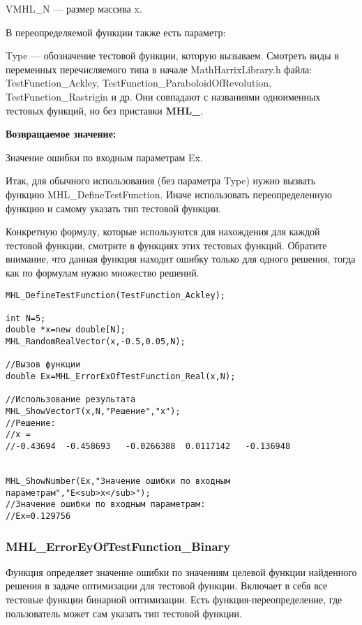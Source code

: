 \documentclass[a4paper,12pt]{article}
\begin{document}
VMHL\_N --- размер массива x.

В переопределяемой функции также есть параметр:
  
Type --- обозначение тестовой функции, которую вызываем.
Смотреть виды в переменных перечисляемого типа в начале MathHarrixLibrary.h файла: TestFunction\_Ackley, TestFunction\_ParaboloidOfRevolution, TestFunction\_Rastrigin и др. Они совпадают с названиями одноименных тестовых функций, но без приставки \textbf{MHL\_}.

\textbf{Возвращаемое значение:}
 
Значение ошибки по входным параметрам Ex.

Итак, для обычного использования (без параметра Type) нужно вызвать функцию MHL\_DefineTestFunction. Иначе использовать переопределенную функцию и самому указать тип тестовой функции.

Конкретную формулу, которые используются для нахождения для каждой тестовой функции, смотрите в функциях этих тестовых функций. Обратите внимание, что данная функция находит ошибку только для одного решения, тогда как по формулам нужно множество решений.


\begin{lstlisting}[label=code_use_MHL_ErrorExOfTestFunction_Real,caption=Пример использования]
MHL_DefineTestFunction(TestFunction_Ackley);

int N=5;
double *x=new double[N];
MHL_RandomRealVector(x,-0.5,0.05,N);

//Вызов функции
double Ex=MHL_ErrorExOfTestFunction_Real(x,N);

//Использование результата
MHL_ShowVectorT(x,N,"Решение","x");
//Решение:
//x =
//-0.43694	-0.458693	-0.0266388	0.0117142	-0.136948


MHL_ShowNumber(Ex,"Значение ошибки по входным параметрам","E<sub>x</sub>");
//Значение ошибки по входным параметрам:
//Ex=0.129756
\end{lstlisting}

\subsubsection{MHL\_ErrorEyOfTestFunction\_Binary}\label{MHL_ErrorEyOfTestFunction_Binary}

Функция определяет значение ошибки по значениям целевой функции найденного решения в задаче оптимизации для тестовой функции. Включает в себя все тестовые функции бинарной оптимизации. Есть функция-переопределение, где пользователь может сам указать тип тестовой функции.
\end{document}

